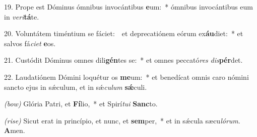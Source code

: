 19. Prope est Dóminus ómnibus invocántibus \textbf{e}um:~*
	ómnibus invocántibus eum in \textit{ve}\textit{ri}\textbf{tá}te.

20. Voluntátem timéntium se fáciet:~\GreDagger\
	et deprecatiónem eórum ex\textbf{áu}diet:~*
	et salvos fá\textit{ci}\textit{et} \textbf{e}os.

21. Custódit Dóminus omnes dili\textbf{gén}tes se:~*
	et omnes peccató\textit{res} \textit{dis}\textbf{pér}det.

22. Laudatiónem Dómini loquétur os \textbf{me}um:~*
	et benedícat omnis caro nómini sancto ejus in s\'{\ae}culum, et in s\'{\ae}\textit{cu}\textit{lum} \textbf{s\'{\ae}}culi.

\textit{(bow)} Glória Patri, et \textbf{Fí}lio,~*
	et Spirí\textit{tu}\textit{i} \textbf{Sanc}to.

\textit{(rise)} Sicut erat in princípio, et nunc, et \textbf{sem}per,~*
	et in s\'{\ae}cula sæcu\textit{ló}\textit{rum}. \textbf{A}men.